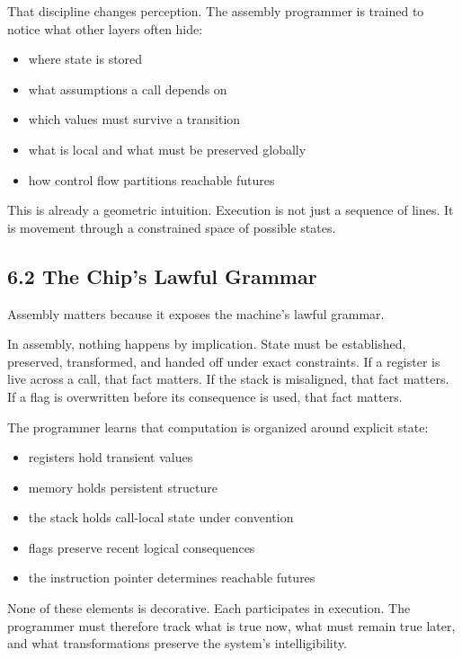 That discipline changes perception. The assembly programmer is trained
to notice what other layers often hide:

\begin{itemize}
\tightlist
\item
  where state is stored
\item
  what assumptions a call depends on
\item
  which values must survive a transition
\item
  what is local and what must be preserved globally
\item
  how control flow partitions reachable futures
\end{itemize}

This is already a geometric intuition. Execution is not just a sequence
of lines. It is movement through a constrained space of possible states.

\hypertarget{the-chips-lawful-grammar}{%
\subsection{6.2 The Chip's Lawful
Grammar}\label{the-chips-lawful-grammar}}

Assembly matters because it exposes the machine's lawful grammar.

In assembly, nothing happens by implication. State must be established,
preserved, transformed, and handed off under exact constraints. If a
register is live across a call, that fact matters. If the stack is
misaligned, that fact matters. If a flag is overwritten before its
consequence is used, that fact matters.

The programmer learns that computation is organized around explicit
state:

\begin{itemize}
\tightlist
\item
  registers hold transient values
\item
  memory holds persistent structure
\item
  the stack holds call-local state under convention
\item
  flags preserve recent logical consequences
\item
  the instruction pointer determines reachable futures
\end{itemize}

None of these elements is decorative. Each participates in execution.
The programmer must therefore track what is true now, what must remain
true later, and what transformations preserve the system's
intelligibility.

